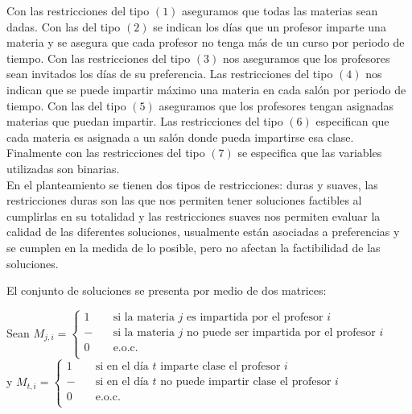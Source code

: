 \documentclass[12pt,spanish]{report}
\begin{document}
Con las restricciones del tipo $(1)$ aseguramos que todas las materias sean dadas. Con las del tipo $(2)$ se indican los días que un profesor imparte una materia y se asegura que cada profesor no tenga más de un curso por periodo de tiempo. Con las restricciones del tipo $(3)$ nos aseguramos que los profesores sean invitados los días de su preferencia. Las restricciones del tipo $(4)$ nos indican que se puede impartir máximo una materia en cada salón por periodo de tiempo. Con las del tipo $(5)$ aseguramos que los profesores tengan asignadas materias que puedan impartir. Las restricciones del tipo $(6)$ especifican que cada materia es asignada a un salón donde pueda impartirse esa clase. Finalmente con las restricciones del tipo $(7)$ se especifica que las variables utilizadas son binarias.\\



En el planteamiento se tienen dos tipos de restricciones: duras y suaves, las restricciones duras son las que nos permiten tener soluciones factibles al cumplirlas en su totalidad y las restricciones suaves nos permiten evaluar la calidad de las diferentes soluciones, usualmente están asociadas a preferencias y se cumplen en la medida de lo posible, pero no afectan la factibilidad de las soluciones.



El conjunto de soluciones se presenta por medio de dos matrices:
  
  Sean $ M_{j,i} =
  \begin{cases}
1  & \quad \text{si la materia } j \text{ es impartida por el profesor } i \\
-  & \quad \text{si la materia } j \text{ no puede ser impartida por el profesor } i\\
0  & \quad \text{e.o.c. } \\
\end{cases}
$\\

y $ M_{t,i} =
  \begin{cases}
1  & \quad \text{si en el día } t \text{ imparte clase el profesor } i  \\
-  & \quad \text{si en el día } t \text{ no puede impartir clase el profesor } i  \\
0  & \quad \text{e.o.c. } \\
\end{cases}
$\\
\end{document}
